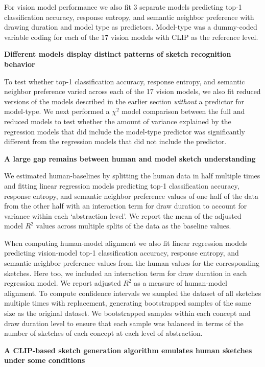 \documentclass{article}
\begin{document}
For vision model performance we also fit 3 separate models predicting top-1 classification accuracy, response entropy, and semantic neighbor preference with drawing duration and model type as predictors. Model-type was a dummy-coded variable coding for each of the 17 vision models with CLIP as the reference level.

\textbf{Different models display distinct patterns of sketch recognition behavior}

To test whether top-1 classification accuracy, response entropy, and semantic neighbor preference varied across each of the 17 vision models, we also fit reduced versions of the models described in the earlier section \textit{without} a predictor for model-type. 
We next performed a $\chi^2$ model comparison between the full and reduced models to test whether the amount of variance explained by the regression models that did include the model-type predictor was significantly different from the regression models that did not include the predictor. 


\textbf{A large gap remains between human and model sketch understanding}

We estimated human-baselines by splitting the human data in half multiple times and fitting linear regression models predicting top-1 classification accuracy, response entropy, and semantic neighbor preference values of one half of the data from the other half with an interaction term for draw duration to account for variance within each `abstraction level'. We report the mean of the adjusted model $R^2$ values across multiple splits of the data as the baseline values. 

When computing human-model alignment we also fit linear regression models predicting vision-model top-1 classification accuracy, response entropy, and semantic neighbor preference values from the human values for the corresponding sketches.
Here too, we included an interaction term for draw duration in each regression model. We report adjusted $R^2$ as a measure of human-model alignment.
To compute confidence intervals we sampled the dataset of all sketches multiple times with replacement, generating bootstrapped samples of the same size as the original dataset.
We bootstrapped samples within each concept and draw duration level to ensure that each sample was balanced in terms of the number of sketches of each concept at each level of abstraction.


\textbf{A CLIP-based sketch generation algorithm emulates human sketches under some conditions}
\end{document}

